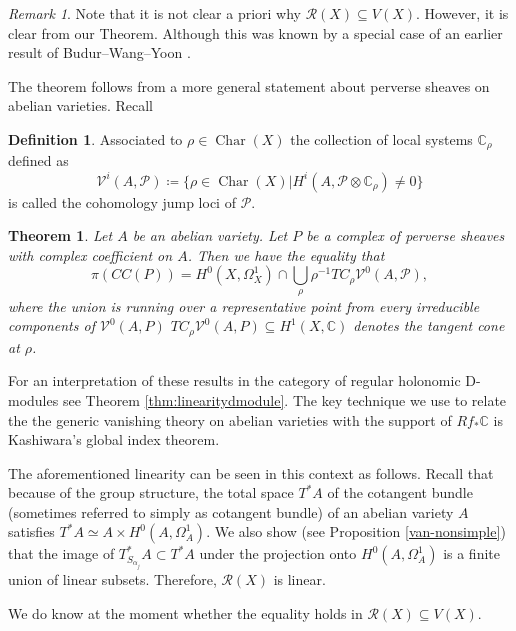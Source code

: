 \documentclass[11pt,reqno]{amsart}
\newtheorem{alphtheorem}{Theorem}
\theoremstyle{definition}
\newtheorem{definition}[theorem]{Definition}
\theoremstyle{remark}
\newtheorem{remark}[theorem]{Remark}
\theoremstyle{cited}
\theoremstyle{citeddef}
\DeclareMathOperator{\Char}{Char}
\newcommand{\sP}{\mathcal{P}}
\newcommand{\sR}{\mathcal{R}}
\newcommand\sV{{\mathcal V}}
\newcommand{\bbC}{\mathbb{C}}
\begin{document}
\begin{remark}
Note that it is not clear a priori why $\sR(X)\subseteq V(X)$. However, it is clear from our Theorem. Although this was known by a special case of an earlier result of Budur--Wang--Yoon
\cite{BWY}.

\end{remark}
The theorem follows from a more general statement
about perverse sheaves on abelian varieties. Recall
\begin{definition}
Associated to $\rho\in \Char(X)$ the collection of local systems $\bbC_{\rho}$ defined as
\[\sV^i(A, \sP) \coloneqq \{\rho\in\Char(X)| H^i(A, \sP\otimes \bbC_{\rho}) \neq 0\}\]
is called the cohomology jump loci of $\sP$.
\label{def:cjl}
\end{definition}
\begin{alphtheorem}
Let $A$ be an abelian variety. Let $P$ be a complex of perverse sheaves with complex coefficient on $A$. 
Then we have the equality that
$$\pi(CC(P)) = H^0(X, \Omega_X^1)\cap \bigcup_{\rho} \rho^{-1} TC_{\rho} \sV^0(A,\sP), $$
where the union is running over a representative point from every irreducible components of $\sV^0(A,P)$
$TC_{\rho} \sV^0(A,P) \subseteq H^1(X, \bbC)$ denotes the tangent cone at $\rho$. 
\label{thm:perverse}
\end{alphtheorem}

For an
interpretation of these results in the category of regular holonomic D-modules
see Theorem \ref{thm:linearitydmodule}. The key technique we
use to relate the the generic vanishing theory on abelian varieties with the support of $Rf_*\bbC$ is Kashiwara's
global index theorem. 

The aforementioned linearity can be seen in this context
as follows. Recall that because of the group structure, the total space $T^*A$ of the cotangent bundle (sometimes referred to simply as cotangent bundle) of an abelian variety $A$ satisfies $T^*A\simeq A\times H^0(A, \Omega_A^1)$. We also show 
(see Proposition \ref{van-nonsimple}) that the image of $T^*_{S_{\alpha_j}}A\subset T^*A$ under the projection onto $H^0(A,\Omega_A^1)$ is a finite union of linear subsets. Therefore, $\sR(X)$
is  linear. 

We do know at the moment whether the equality holds in $\sR(X) \subseteq V(X)$. 
\end{document}
